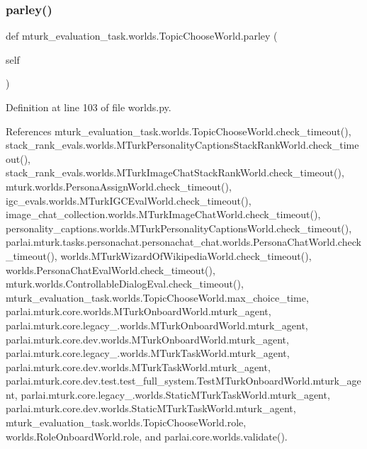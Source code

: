\subsubsection{\texorpdfstring{parley()}{parley()}}
{\footnotesize\ttfamily def mturk\+\_\+evaluation\+\_\+task.\+worlds.\+Topic\+Choose\+World.\+parley (\begin{DoxyParamCaption}\item[{}]{self }\end{DoxyParamCaption})}



Definition at line 103 of file worlds.\+py.



References mturk\+\_\+evaluation\+\_\+task.\+worlds.\+Topic\+Choose\+World.\+check\+\_\+timeout(), stack\+\_\+rank\+\_\+evals.\+worlds.\+M\+Turk\+Personality\+Captions\+Stack\+Rank\+World.\+check\+\_\+timeout(), stack\+\_\+rank\+\_\+evals.\+worlds.\+M\+Turk\+Image\+Chat\+Stack\+Rank\+World.\+check\+\_\+timeout(), mturk.\+worlds.\+Persona\+Assign\+World.\+check\+\_\+timeout(), igc\+\_\+evals.\+worlds.\+M\+Turk\+I\+G\+C\+Eval\+World.\+check\+\_\+timeout(), image\+\_\+chat\+\_\+collection.\+worlds.\+M\+Turk\+Image\+Chat\+World.\+check\+\_\+timeout(), personality\+\_\+captions.\+worlds.\+M\+Turk\+Personality\+Captions\+World.\+check\+\_\+timeout(), parlai.\+mturk.\+tasks.\+personachat.\+personachat\+\_\+chat.\+worlds.\+Persona\+Chat\+World.\+check\+\_\+timeout(), worlds.\+M\+Turk\+Wizard\+Of\+Wikipedia\+World.\+check\+\_\+timeout(), worlds.\+Persona\+Chat\+Eval\+World.\+check\+\_\+timeout(), mturk.\+worlds.\+Controllable\+Dialog\+Eval.\+check\+\_\+timeout(), mturk\+\_\+evaluation\+\_\+task.\+worlds.\+Topic\+Choose\+World.\+max\+\_\+choice\+\_\+time, parlai.\+mturk.\+core.\+worlds.\+M\+Turk\+Onboard\+World.\+mturk\+\_\+agent, parlai.\+mturk.\+core.\+legacy\+\_.\+worlds.\+M\+Turk\+Onboard\+World.\+mturk\+\_\+agent, parlai.\+mturk.\+core.\+dev.\+worlds.\+M\+Turk\+Onboard\+World.\+mturk\+\_\+agent, parlai.\+mturk.\+core.\+legacy\+\_.\+worlds.\+M\+Turk\+Task\+World.\+mturk\+\_\+agent, parlai.\+mturk.\+core.\+dev.\+worlds.\+M\+Turk\+Task\+World.\+mturk\+\_\+agent, parlai.\+mturk.\+core.\+dev.\+test.\+test\+\_\+full\+\_\+system.\+Test\+M\+Turk\+Onboard\+World.\+mturk\+\_\+agent, parlai.\+mturk.\+core.\+legacy\+\_.\+worlds.\+Static\+M\+Turk\+Task\+World.\+mturk\+\_\+agent, parlai.\+mturk.\+core.\+dev.\+worlds.\+Static\+M\+Turk\+Task\+World.\+mturk\+\_\+agent, mturk\+\_\+evaluation\+\_\+task.\+worlds.\+Topic\+Choose\+World.\+role, worlds.\+Role\+Onboard\+World.\+role, and parlai.\+core.\+worlds.\+validate().

